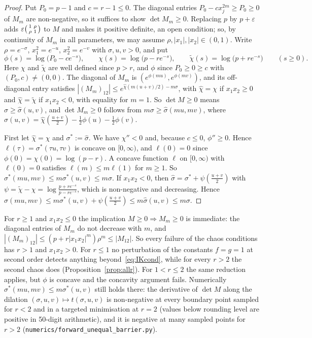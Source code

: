\documentclass[11pt]{amsart}
\theoremstyle{definition}
\begin{document}
\begin{proof}
Put $P_0=p-1$ and $c=r-1\le0$. The diagonal entries $P_0-cx_j^{2m}\ge P_0\ge0$ of $M_m$ are non-negative, so it suffices
to show $\det M_m\ge0$. Replacing $p$ by $p+\varepsilon$ adds $\varepsilon\begin{psmallmatrix}1&\rho\\\rho&1\end{psmallmatrix}$
to $M$ and makes it positive definite, an open condition; so, by continuity of $M_m$ in all parameters, we may assume
$\rho,|x_1|,|x_2|\in(0,1)$. Write $\rho=e^{-\sigma}$, $x_1^2=e^{-u}$, $x_2^2=e^{-v}$ with $\sigma,u,v>0$, and put
\[
\phi(s)=\log\big(P_0-ce^{-s}\big),\qquad\chi(s)=\log\big(p-re^{-s}\big),\qquad\tilde\chi(s)=\log\big(p+re^{-s}\big)
\qquad(s\ge0).
\]
Here $\chi$ and $\tilde\chi$ are well defined since $p>r$, and $\phi$ since $P_0\ge0\ge c$ with $(P_0,c)\ne(0,0)$.
The diagonal of $M_m$ is $(e^{\phi(mu)},e^{\phi(mv)})$, and its off-diagonal entry satisfies
$|(M_m)_{12}|\le e^{\hat\chi(m(u+v)/2)-m\sigma}$, with $\hat\chi=\chi$ if $x_1x_2\ge0$ and $\hat\chi=\tilde\chi$ if
$x_1x_2<0$, with equality for $m=1$. So $\det M\ge0$ means $\sigma\ge\hat\sigma(u,v)$, and $\det M_m\ge0$ follows from
$m\sigma\ge\hat\sigma(mu,mv)$, where $\hat\sigma(u,v)=\hat\chi(\frac{u+v}2)-\frac12\phi(u)-\frac12\phi(v)$.

First let $\hat\chi=\chi$ and $\sigma^*:=\hat\sigma$. We have $\chi''<0$ and, because $c\le0$, $\phi''\ge0$. Hence
$\ell(\tau)=\sigma^*(\tau u,\tau v)$ is concave on $[0,\infty)$, and $\ell(0)=0$ since $\phi(0)=\chi(0)=\log(p-r)$. A
concave function $\ell$ on $[0,\infty)$ with $\ell(0)=0$ satisfies $\ell(m)\le m\ell(1)$ for $m\ge1$. So
$\sigma^*(mu,mv)\le m\sigma^*(u,v)\le m\sigma$. If $x_1x_2<0$, then $\hat\sigma=\sigma^*+\psi(\frac{u+v}2)$ with
$\psi=\tilde\chi-\chi=\log\frac{p+re^{-s}}{p-re^{-s}}$, which is non-negative and decreasing. Hence
$\hat\sigma(mu,mv)\le m\sigma^*(u,v)+\psi(\frac{u+v}2)\le m\hat\sigma(u,v)\le m\sigma$.
\end{proof}

For $r\ge1$ and $x_1x_2\le0$ the implication $M\ge0\Rightarrow M_m\ge0$ is immediate: the diagonal entries of $M_m$ do not
decrease with $m$, and $|(M_m)_{12}|\le(p+r|x_1x_2|^m)\rho^m\le|M_{12}|$. So every failure of the chaos conditions has
$r>1$ and $x_1x_2>0$. For $r\le1$ no perturbation of the constants $f=g=1$ at second order detects anything
beyond~\eqref{eq:IKcond}, while for every $r>2$ the second chaos does (Proposition~\ref{prop:allr}). For $1<r\le2$ the
same reduction applies, but $\phi$ is concave and the concavity argument fails. Numerically
$\sigma^*(mu,mv)\le m\sigma^*(u,v)$ still holds there: the derivative of $\det M$ along the dilation
$(\sigma,u,v)\mapsto t(\sigma,u,v)$ is non-negative at every boundary point sampled for $r<2$ and in a targeted
minimisation at $r=2$ (values below rounding level are positive in 50-digit arithmetic), and it is negative at many
sampled points for $r>2$ (\texttt{numerics/forward\_unequal\_barrier.py}).
\end{document}
